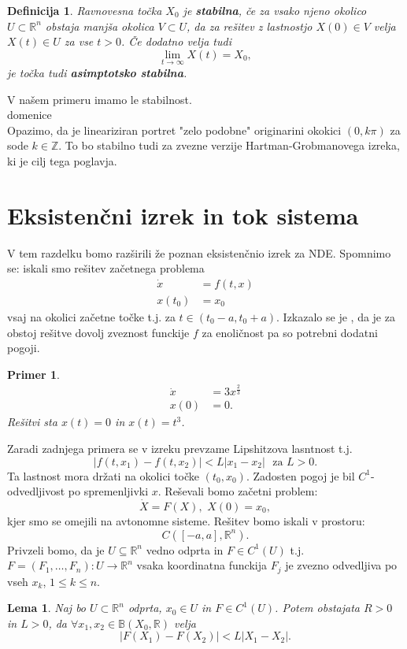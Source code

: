 \documentclass{article}
\newtheorem{definicija}{Definicija}
\newtheorem{lema}{Lema}
\newtheorem{primer}{Primer}
\newcommand{\Z}{\mathbb{Z}}
\newcommand{\R}{\mathbb{R}}
\begin{document}
\begin{definicija}
Ravnovesna točka $X_0$ je \textbf{stabilna}, če za vsako njeno okolico 
$U \subset \R^n$ obstaja manjša okolica $V \subset U$, da za rešitev 
z lastnostjo $X(0) \in V$ velja $X(t) \in U$ za vse $t > 0$. Če 
dodatno velja tudi
$$
\lim_{t\rightarrow \infty} X(t) = X_0, 
$$
je točka tudi \textbf{asimptotsko stabilna}.
\end{definicija}
V našem primeru imamo le stabilnost. \\
domenice\\
Opazimo, da je lineariziran portret "zelo podobne" originarini 
okokici $(0, k\pi)$ za sode $k\in \Z$. To bo stabilno tudi za zvezne 
verzije Hartman-Grobmanovega izreka, ki je cilj tega poglavja.

\section{Eksistenčni izrek in tok sistema}

V tem razdelku bomo razširili že poznan eksistenčnio izrek za NDE.
Spomnimo se: iskali smo rešitev začetnega problema
\begin{align*}
\dot{x} &= f(t, x) \\
x(t_0) &= x_0
\end{align*}
vsaj na okolici začetne točke t.j. za $t\in (t_0 - a, t_0 + a)$.
Izkazalo se je , da je za obstoj rešitve dovolj zveznost funckije $f$ za
enoličnost pa so potrebni dodatni pogoji. 
\begin{primer}
\begin{align*}
\dot{x} &= 3x^\frac{2}{3} \\
x(0) &= 0. 
\end{align*}
Rešitvi sta $x(t) = 0$ in $x(t) = t^3$.
\end{primer}
Zaradi zadnjega primera se v izreku prevzame Lipshitzova lasntnost t.j.
$$
|f(t, x_1) - f(t, x_2)| < L |x_1 - x_2|\,\, \text{ za } L>0.
$$
Ta lastnost mora držati na okolici točke $(t_0, x_0)$.
Zadosten pogoj je bil $C^1$-odvedljivost po spremenljivki $x$.
Reševali bomo začetni problem: 
$$
\dot{X} = F(X),\,\, X(0) = x_0,
$$
kjer smo se omejili na avtonomne sisteme. Rešitev bomo iskali v prostoru:
$$
C([-a, a], \R^n).
$$
Privzeli bomo, da je $U \subseteq \R^n$ vedno odprta in $F \in C^1(U)$
t.j. $F = (F_1, \dots, F_n): U \rightarrow \R^n$ vsaka koordinatna 
funckija $F_j$ je zvezno odvedljiva po vseh $x_k$, $1 \leq k \leq n$.

\begin{lema}
Naj bo $U \subset \R^n$ odprta, $x_0 \in U$ in $F\in C^1(U)$.
Potem obstajata $R > 0$ in $L > 0$, da $\forall x_1, x_2 \in \mathbb{B}(X_0, \R)$
velja 
$$
|F(X_1) - F(X_2)| < L|X_1 - X_2|.
$$
\end{lema}
\end{document}
